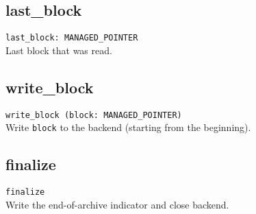 \subsection{last\_block}
\lstinline;last_block: MANAGED_POINTER;\\
Last block that was read.

\subsection{write\_block}
\lstinline;write_block (block: MANAGED_POINTER);\\
Write \lstinline;block; to the backend (starting from the beginning).

\subsection{finalize}
\lstinline;finalize;\\
Write the end-of-archive indicator and close backend.

